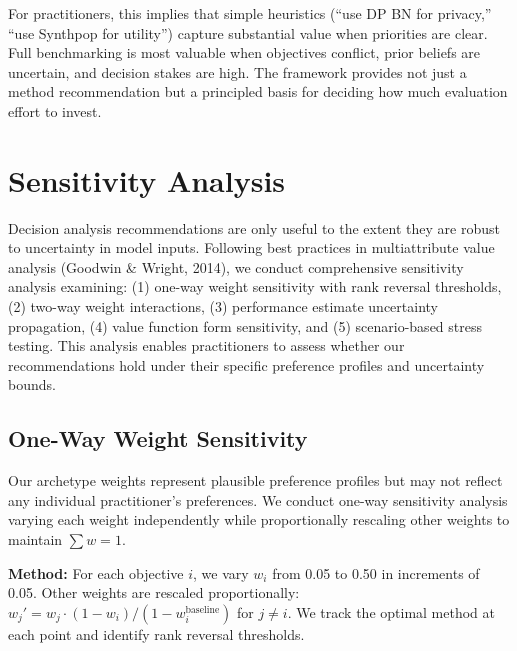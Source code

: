\documentclass[12pt,a4paper]{article}
\begin{document}
For practitioners, this implies that simple heuristics (``use DP BN for privacy,'' ``use Synthpop for utility'') capture substantial value when priorities are clear. Full benchmarking is most valuable when objectives conflict, prior beliefs are uncertain, and decision stakes are high. The framework provides not just a method recommendation but a principled basis for deciding how much evaluation effort to invest.

\section{Sensitivity Analysis}

Decision analysis recommendations are only useful to the extent they are robust to uncertainty in model inputs. Following best practices in multiattribute value analysis (Goodwin \& Wright, 2014), we conduct comprehensive sensitivity analysis examining: (1) one-way weight sensitivity with rank reversal thresholds, (2) two-way weight interactions, (3) performance estimate uncertainty propagation, (4) value function form sensitivity, and (5) scenario-based stress testing. This analysis enables practitioners to assess whether our recommendations hold under their specific preference profiles and uncertainty bounds.

\subsection{One-Way Weight Sensitivity}

Our archetype weights represent plausible preference profiles but may not reflect any individual practitioner's preferences. We conduct one-way sensitivity analysis varying each weight independently while proportionally rescaling other weights to maintain $\sum w = 1$.

\textbf{Method:} For each objective $i$, we vary $w_i$ from 0.05 to 0.50 in increments of 0.05. Other weights are rescaled proportionally: $w_j' = w_j \cdot (1 - w_i) / (1 - w_i^{\text{baseline}})$ for $j \neq i$. We track the optimal method at each point and identify rank reversal thresholds.
\end{document}
